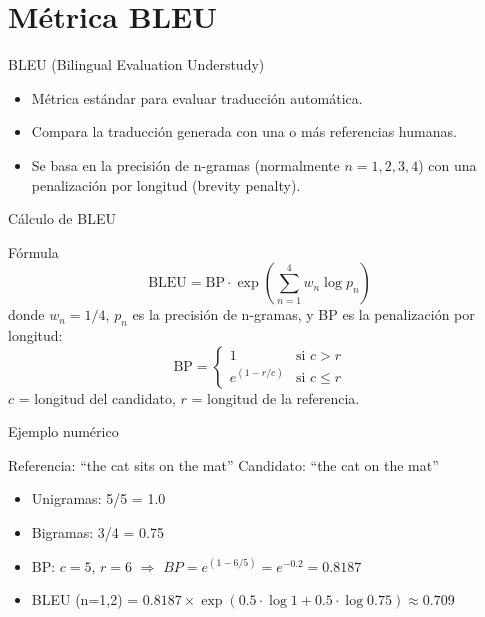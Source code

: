 \documentclass[aspectratio=169, 10pt, xcolor=table]{beamer}
\begin{document}
\section{Métrica BLEU}

\begin{frame}{BLEU (Bilingual Evaluation Understudy)}
    \begin{itemize}
        \item Métrica estándar para evaluar traducción automática.
        \item Compara la traducción generada con una o más referencias humanas.
        \item Se basa en la precisión de n-gramas (normalmente $n=1,2,3,4$) con una penalización por longitud (brevity penalty).
    \end{itemize}
\end{frame}

\begin{frame}{Cálculo de BLEU}
    \begin{block}{Fórmula}
        \[
        \text{BLEU} = \text{BP} \cdot \exp\left( \sum_{n=1}^{4} w_n \log p_n \right)
        \]
        donde $w_n = 1/4$, $p_n$ es la precisión de n-gramas, y BP es la penalización por longitud:
        \[
        \text{BP} = \begin{cases}
            1 & \text{si } c > r \\
            e^{(1 - r/c)} & \text{si } c \le r
        \end{cases}
        \]
        $c$ = longitud del candidato, $r$ = longitud de la referencia.
    \end{block}
\end{frame}

\begin{frame}{Ejemplo numérico}
    \begin{exampleblock}{Referencia: ``the cat sits on the mat''}
        Candidato: ``the cat on the mat''
        \begin{itemize}
            \item Unigramas: 5/5 = 1.0
            \item Bigramas: 3/4 = 0.75
            \item BP: $c=5$, $r=6$ $\Rightarrow$ $BP = e^{(1-6/5)} = e^{-0.2} = 0.8187$
            \item BLEU (n=1,2) = $0.8187 \times \exp(0.5 \cdot \log 1 + 0.5 \cdot \log 0.75) \approx 0.709$
        \end{itemize}
    \end{exampleblock}
\end{frame}
\end{document}
